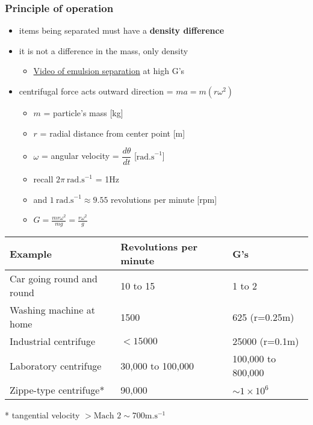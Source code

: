 \begin{frame}\frametitle{Principle of operation}

	\begin{itemize}
		\item	items being separated must have a \textbf{{\color{purple}density difference}}
		\item	it is not a difference in the mass, only density
			\begin{itemize}
				\item	\href{http://www.youtube.com/watch?v=M1vWI0t-XD8}{Video of emulsion separation} at high G's
			\end{itemize}
		\item	centrifugal force acts outward direction = $ma = m (r\omega^2)$
		\begin{itemize}
			\item	$m$ = particle's mass [kg]
			\item	$r$ = radial distance from center point [m]
			\item	$\omega$ = angular velocity = $\dfrac{d\theta}{dt}$  [$\text{rad.s}^{-1}$]
			\item	recall $2\pi~\text{rad.s}^{-1}$ = 1Hz
			\item	and $1~\text{rad.s}^{-1} \approx 9.55$ revolutions per minute [rpm]
			\item	$G = \displaystyle \frac{m r\omega^2}{mg} = \displaystyle \frac{r\omega^2}{g}$
		\end{itemize}
	\end{itemize}
	\vspace{12pt}
	\small
	\begin{tabular}{l|l|l}

		\textbf{Example}							& \textbf{Revolutions per minute}  & \textbf{G's}\\		 \hline
		Car going round and round 	    			& 10 to 15   			  & 1 to 2	\\
		Washing machine at home 					& 1500       			  & 625 (r=0.25m)	\\
		Industrial centrifuge						& $<15 000$ 			  & 25000 (r=0.1m)	\\
		Laboratory centrifuge 						& 30,000 to 100,000       & 100,000 to 800,000\\   %
		Zippe-type centrifuge*						& 90,000                  & $\sim 1 \times 10^6$ \\ \hline
	\end{tabular}
	* tangential velocity $> \text{Mach 2} \sim 700 \text{m.s}^{-1}$
\end{frame}

